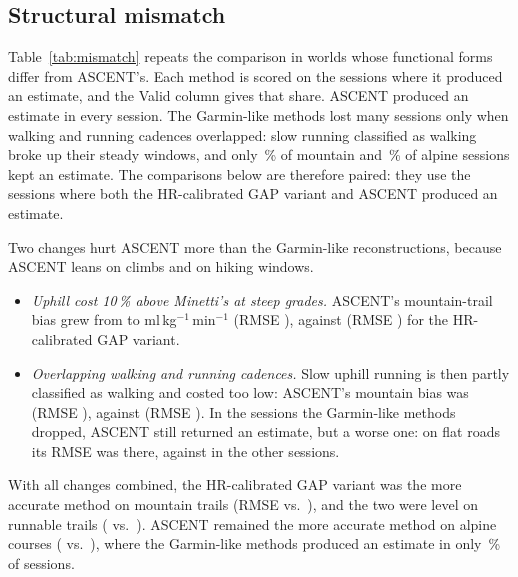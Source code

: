 \documentclass[11pt,a4paper]{article}
\newcommand{\unit}{ml\,kg$^{-1}$\,min$^{-1}$}
\newcommand{\ascent}{ASCENT}
\begin{document}
\subsection{Structural mismatch}\label{sec:mismatch}
Table~\ref{tab:mismatch} repeats the comparison in worlds whose functional forms differ from \ascent's. Each method is scored on the sessions where it produced an estimate, and the Valid column gives that share. \ascent{} produced an estimate in every session. The Garmin-like methods lost many sessions only when walking and running cadences overlapped: slow running classified as walking broke up their steady windows, and only \nmmCovCadOverlapmountain\,\% of mountain and \nmmCovCadOverlapskyrun\,\% of alpine sessions kept an estimate. The comparisons below are therefore paired: they use the sessions where both the HR-calibrated GAP variant and \ascent{} produced an estimate.

Two changes hurt \ascent{} more than the Garmin-like reconstructions, because \ascent{} leans on climbs and on hiking windows.
\begin{itemize}[leftmargin=*]
\item \emph{Uphill cost 10\,\% above Minetti's at steep grades.} \ascent's mountain-trail bias grew from \nmmBasemountainASCENT{} to \nmmCTiltUpmountainASCENT{} \unit{} (RMSE \nmmCRTiltUpmountainASCENT), against \nmmCTiltUpmountainGtrailhrgap{} (RMSE \nmmCRTiltUpmountainGtrailhrgap) for the HR-calibrated GAP variant.
\item \emph{Overlapping walking and running cadences.} Slow uphill running is then partly classified as walking and costed too low: \ascent's mountain bias was \nmmCCadOverlapmountainASCENT{} (RMSE \nmmCRCadOverlapmountainASCENT), against \nmmCCadOverlapmountainGtrailhrgap{} (RMSE \nmmCRCadOverlapmountainGtrailhrgap). In the sessions the Garmin-like methods dropped, \ascent{} still returned an estimate, but a worse one: on flat roads its RMSE was \nmmRDropCadOverlaproadflat{} there, against \nmmCRCadOverlaproadflatASCENT{} in the other sessions.
\end{itemize}
With all changes combined, the HR-calibrated GAP variant was the more accurate method on mountain trails (RMSE \nmmCRAllMismountainGtrailhrgap{} vs.\ \nmmCRAllMismountainASCENT), and the two were level on runnable trails (\nmmCRAllMistrailrunnableGtrailhrgap{} vs.\ \nmmCRAllMistrailrunnableASCENT). \ascent{} remained the more accurate method on alpine courses (\nmmCRAllMisskyrunASCENT{} vs.\ \nmmCRAllMisskyrunGtrailhrgap), where the Garmin-like methods produced an estimate in only \nmmCovAllMisskyrun\,\% of sessions.
\end{document}
